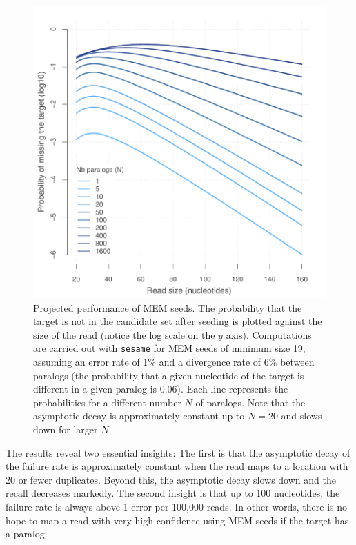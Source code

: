 \documentclass[a4,center,fleqn]{NAR}
\begin{document}
\begin{figure}[t]
\begin{center}
\includegraphics[scale=.6]{MEM_19.pdf}
\end{center}
\caption{Projected performance of MEM seeds. The probability that the
target is not in the candidate set after seeding  is plotted against the
size of the read (notice the log scale on the $y$ axis). Computations are
carried out with \texttt{sesame} for MEM seeds of minimum size 19,
assuming an error rate of 1\% and a divergence rate of 6\% between
paralogs (the probability that a given nucleotide of the target is
different in a given paralog is 0.06). Each line represents the
probabilities for a different number $N$ of paralogs. Note that the
asymptotic decay is approximately constant up to $N = 20$ and slows down
for larger $N$.}
\label{fig_MEM}
\end{figure}

The results reveal two essential insights: The first is that the
asymptotic decay of the failure rate is approximately constant when the
read maps to a location with 20 or fewer duplicates. Beyond this, the
asymptotic decay slows down and the recall decreases markedly. The second
insight is that up to 100 nucleotides, the failure rate is always above 1
error per 100,000 reads. In other words, there is no hope to map a read
with very high confidence using MEM seeds if the target has a paralog.
\end{document}

